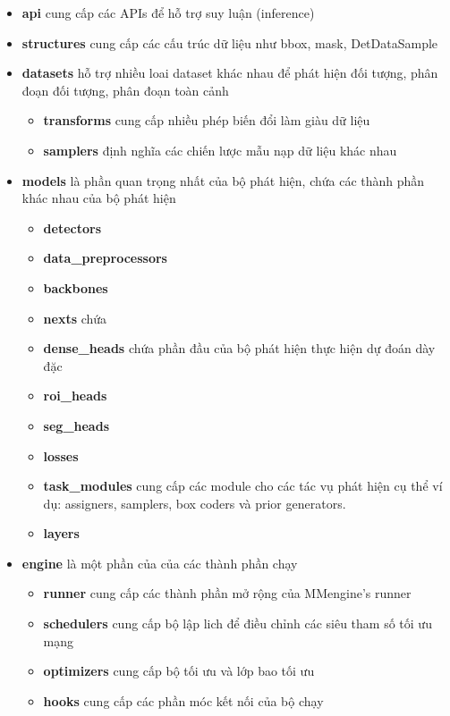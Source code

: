\documentclass[12pt,a4paper,openany,oneside]{report}
\begin{document}
\begin{itemize}
	\item \textbf{api} cung cấp các APIs để hỗ trợ suy luận (inference)
	\item \textbf{structures} cung cấp các cấu trúc dữ liệu như bbox, mask, DetDataSample
	\item \textbf{datasets} hỗ trợ nhiều loai dataset khác nhau để phát hiện đối tượng, phân đoạn đối tượng, phân đoạn toàn cảnh
	\begin{itemize}
		\item \textbf{transforms} cung cấp nhiều phép biến đổi làm giàu dữ liệu
	   \item \textbf{samplers} định nghĩa các chiến lược mẫu nạp dữ liệu khác nhau
	\end{itemize}

	\item \textbf{models} là phần quan trọng nhất của bộ phát hiện, chứa các thành phần khác nhau của bộ phát hiện
	\begin{itemize}
	\item \textbf{detectors} 
	\item \textbf{data\_preprocessors} 
	\item \textbf{backbones}  
	\item \textbf{nexts} chứa  
	\item \textbf{dense\_heads} chứa phần đầu của bộ phát hiện thực hiện dự đoán dày đặc
	\item \textbf{roi\_heads}  
	\item \textbf{seg\_heads}  
	\item \textbf{losses} 
	\item \textbf{task\_modules}  cung cấp các module cho các tác vụ phát hiện cụ thể 
		 ví dụ: assigners, samplers, box coders và prior generators.
	\item \textbf{layers} 
	\end{itemize}
	\item \textbf{engine} là một phần của của các thành phần chạy
	\begin{itemize}
		\item \textbf{runner} cung cấp các thành phần mở rộng của MMengine's runner
		\item \textbf{schedulers} cung cấp bộ lập lich để điều chỉnh các siêu tham số tối ưu mạng
		\item \textbf{optimizers} cung cấp bộ tối ưu và lớp bao tối ưu
		\item \textbf{hooks} cung cấp các phần móc kết nối của bộ chạy
		

\end{itemize}
\end{itemize}
\end{document}
